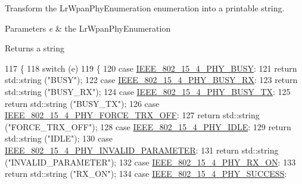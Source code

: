 Transform the Lr\+Wpan\+Phy\+Enumeration enumeration into a printable string. 


\begin{DoxyParams}{Parameters}
{\em e} & the Lr\+Wpan\+Phy\+Enumeration \\
\hline
\end{DoxyParams}
\begin{DoxyReturn}{Returns}
a string 
\end{DoxyReturn}

\begin{DoxyCode}
117 \{
118   \textcolor{keywordflow}{switch} (e)
119     \{
120     \textcolor{keywordflow}{case} \hyperlink{group__lr-wpan_gga6494269d13d45c511a07b7ccbb1de754a14641e5190b66ec8ec3903218058dc46}{IEEE\_802\_15\_4\_PHY\_BUSY}:
121       \textcolor{keywordflow}{return} std::string (\textcolor{stringliteral}{"BUSY"});
122     \textcolor{keywordflow}{case} \hyperlink{group__lr-wpan_gga6494269d13d45c511a07b7ccbb1de754a09f430974fda07ac7d4d483a1ce23b98}{IEEE\_802\_15\_4\_PHY\_BUSY\_RX}:
123       \textcolor{keywordflow}{return} std::string (\textcolor{stringliteral}{"BUSY\_RX"});
124     \textcolor{keywordflow}{case} \hyperlink{group__lr-wpan_gga6494269d13d45c511a07b7ccbb1de754a87f658959801356265b8c28a85569b15}{IEEE\_802\_15\_4\_PHY\_BUSY\_TX}:
125       \textcolor{keywordflow}{return} std::string (\textcolor{stringliteral}{"BUSY\_TX"});
126     \textcolor{keywordflow}{case} \hyperlink{group__lr-wpan_gga6494269d13d45c511a07b7ccbb1de754a878a570a6caffa060865d60b3f92cc09}{IEEE\_802\_15\_4\_PHY\_FORCE\_TRX\_OFF}:
127       \textcolor{keywordflow}{return} std::string (\textcolor{stringliteral}{"FORCE\_TRX\_OFF"});
128     \textcolor{keywordflow}{case} \hyperlink{group__lr-wpan_gga6494269d13d45c511a07b7ccbb1de754af3994414efcd2fac7e312ecb9b3ebd70}{IEEE\_802\_15\_4\_PHY\_IDLE}:
129       \textcolor{keywordflow}{return} std::string (\textcolor{stringliteral}{"IDLE"});
130     \textcolor{keywordflow}{case} \hyperlink{group__lr-wpan_gga6494269d13d45c511a07b7ccbb1de754ac611b9c3a3136400c3d47c6bee4e452d}{IEEE\_802\_15\_4\_PHY\_INVALID\_PARAMETER}:
131       \textcolor{keywordflow}{return} std::string (\textcolor{stringliteral}{"INVALID\_PARAMETER"});
132     \textcolor{keywordflow}{case} \hyperlink{group__lr-wpan_gga6494269d13d45c511a07b7ccbb1de754a9480f69fea1a74b7961ed74d6b3e2f9e}{IEEE\_802\_15\_4\_PHY\_RX\_ON}:
133       \textcolor{keywordflow}{return} std::string (\textcolor{stringliteral}{"RX\_ON"});
134     \textcolor{keywordflow}{case} \hyperlink{group__lr-wpan_gga6494269d13d45c511a07b7ccbb1de754a2a81d56261f039e08cf2dd91de10b618}{IEEE\_802\_15\_4\_PHY\_SUCCESS}:

\end{DoxyCode}
